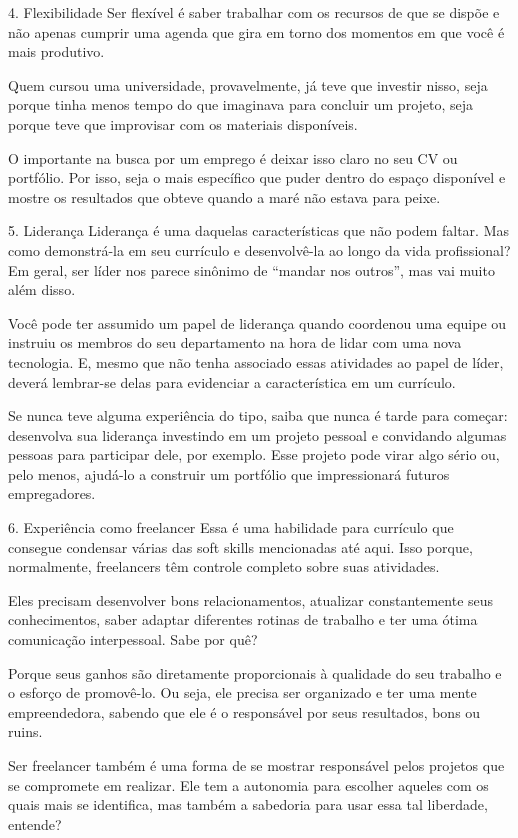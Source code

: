 \begin{commentA}
4. Flexibilidade
Ser flexível é saber trabalhar com os recursos de que se dispõe e não apenas cumprir uma agenda que gira em torno dos momentos em que você é mais produtivo.

Quem cursou uma universidade, provavelmente, já teve que investir nisso, seja porque tinha menos tempo do que imaginava para concluir um projeto, seja porque teve que improvisar com os materiais disponíveis.

O importante na busca por um emprego é deixar isso claro no seu CV ou portfólio. Por isso, seja o mais específico que puder dentro do espaço disponível e mostre os resultados que obteve quando a maré não estava para peixe.

5. Liderança
Liderança é uma daquelas características que não podem faltar. Mas como demonstrá-la em seu currículo e desenvolvê-la ao longo da vida profissional? Em geral, ser líder nos parece sinônimo de “mandar nos outros”, mas vai muito além disso.

Você pode ter assumido um papel de liderança quando coordenou uma equipe ou instruiu os membros do seu departamento na hora de lidar com uma nova tecnologia. E, mesmo que não tenha associado essas atividades ao papel de líder, deverá lembrar-se delas para evidenciar a característica em um currículo.

Se nunca teve alguma experiência do tipo, saiba que nunca é tarde para começar: desenvolva sua liderança investindo em um projeto pessoal e convidando algumas pessoas para participar dele, por exemplo. Esse projeto pode virar algo sério ou, pelo menos, ajudá-lo a construir um portfólio que impressionará futuros empregadores.

6. Experiência como freelancer
Essa é uma habilidade para currículo que consegue condensar várias das soft skills mencionadas até aqui. Isso porque, normalmente, freelancers têm controle completo sobre suas atividades.

Eles precisam desenvolver bons relacionamentos, atualizar constantemente seus conhecimentos, saber adaptar diferentes rotinas de trabalho e ter uma ótima comunicação interpessoal. Sabe por quê?

Porque seus ganhos são diretamente proporcionais à qualidade do seu trabalho e o esforço de promovê-lo. Ou seja, ele precisa ser organizado e ter uma mente empreendedora, sabendo que ele é o responsável por seus resultados, bons ou ruins.

Ser freelancer também é uma forma de se mostrar responsável pelos projetos que se compromete em realizar. Ele tem a autonomia para escolher aqueles com os quais mais se identifica, mas também a sabedoria para usar essa tal liberdade, entende?


\end{commentA}
